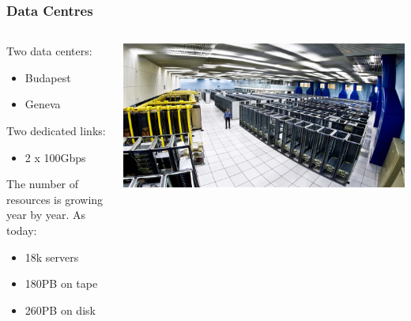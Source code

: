 \documentclass[aspectratio=169]{beamer}
\begin{document}

\begin{frame}
    \frametitle{Data Centres}
    \begin{minipage}[t]{0.95\textwidth}
        \begin{columns}[T]
            \begin{column}{0.5\textwidth}
                Two data centers:
                \begin{itemize}
                    \item Budapest
                    \item Geneva
                \end{itemize}
                Two dedicated links:
                \begin{itemize}
                    \item 2 x 100Gbps
                \end{itemize}
                \vspace{0.1in}
                The number of resources is growing year by year.
                As today:
                \begin{itemize}
                    \item 18k servers
                    \item 180PB on tape
                    \item 260PB on disk
                \end{itemize}
            \end{column}
            \begin{column}{0.5\textwidth}
                \vspace{0.5in}
                \includegraphics[width=1.1\textwidth]{DC_overview.png}
            \end{column}
        \end{columns}
    \end{minipage}
\end{frame}
\end{document}
